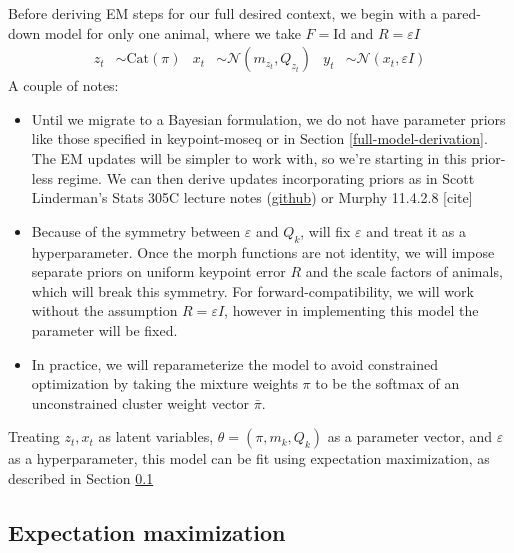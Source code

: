 \documentclass{article}         %
\newcommand{\eps}{\varepsilon}
\begin{document}
Before deriving EM steps for our full desired context, we begin with a pared-down model for only one animal, where we take $F = \mathrm{Id}$ and $R = \eps I$
\begin{align}
    z_t & \sim \text{Cat}(\pi) &
    x_t & \sim \mathcal{N}(m_{z_t}, Q_{z_t}) &
    y_t & \sim \mathcal{N}(x_t, \eps I)
\end{align}
A couple of notes:
\begin{itemize}
    \item Until we migrate to a Bayesian formulation, we do not have parameter priors like those specified in keypoint-moseq or in Section \ref{full-model-derivation}. The EM updates will be simpler to work with, so we're starting in this prior-less regime. We can then derive updates incorporating priors as in Scott Linderman's Stats 305C lecture notes (\href{https://github.com/slinderman/stats305c/blob/spring2023/slides/lecture08-em.pdf}{github}) or Murphy 11.4.2.8 [cite]
    \item Because of the symmetry between $\eps$ and $Q_k$, will fix $\eps$ and treat it as a hyperparameter. Once the morph functions are not identity, we will impose separate priors on uniform keypoint error $R$ and the scale factors of animals, which will break this symmetry. For forward-compatibility, we will work without the assumption $R = \eps I$, however in implementing this model the parameter will be fixed.
    \item In practice, we will reparameterize the model to avoid constrained optimization by taking the mixture weights $\pi$ to be the softmax of an unconstrained cluster weight vector $\bar\pi$.
\end{itemize}
Treating $z_t, x_t$ as latent variables, $\theta = (\pi, m_k, Q_k)$ as a parameter vector, and $\eps$ as a hyperparameter, this model can be fit using expectation maximization, as described in Section \ref{sec:em-general}



\subsection{Expectation maximization}
\label{sec:em-general}
\end{document}

